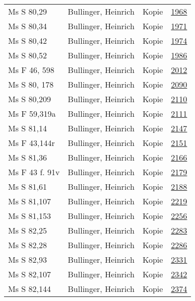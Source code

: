 \documentclass[10pt,a4paper,landscape]{report}
\begin{document}
\begin{longtable}{p{16cm}p{4cm}lr}
Ms S 80,29	&	Bullinger, Heinrich	&	Kopie	&	\href{http://130.60.24.72/assignment/1968}{1968}\\
Ms S 80,34	&	Bullinger, Heinrich	&	Kopie	&	\href{http://130.60.24.72/assignment/1971}{1971}\\
Ms S 80,42	&	Bullinger, Heinrich	&	Kopie	&	\href{http://130.60.24.72/assignment/1974}{1974}\\
Ms S 80,52	&	Bullinger, Heinrich	&	Kopie	&	\href{http://130.60.24.72/assignment/1986}{1986}\\
Ms F 46, 598	&	Bullinger, Heinrich	&	Kopie	&	\href{http://130.60.24.72/assignment/2012}{2012}\\
Ms S 80, 178	&	Bullinger, Heinrich	&	Kopie	&	\href{http://130.60.24.72/assignment/2090}{2090}\\
Ms S 80,209	&	Bullinger, Heinrich	&	Kopie	&	\href{http://130.60.24.72/assignment/2110}{2110}\\
Ms F 59,319a	&	Bullinger, Heinrich	&	Kopie	&	\href{http://130.60.24.72/assignment/2111}{2111}\\
Ms S 81,14	&	Bullinger, Heinrich	&	Kopie	&	\href{http://130.60.24.72/assignment/2147}{2147}\\
Ms F 43,144r	&	Bullinger, Heinrich	&	Kopie	&	\href{http://130.60.24.72/assignment/2151}{2151}\\
Ms S 81,36	&	Bullinger, Heinrich	&	Kopie	&	\href{http://130.60.24.72/assignment/2166}{2166}\\
Ms F 43 f. 91v	&	Bullinger, Heinrich	&	Kopie	&	\href{http://130.60.24.72/assignment/2179}{2179}\\
Ms S 81,61	&	Bullinger, Heinrich	&	Kopie	&	\href{http://130.60.24.72/assignment/2188}{2188}\\
Ms S 81,107	&	Bullinger, Heinrich	&	Kopie	&	\href{http://130.60.24.72/assignment/2219}{2219}\\
Ms S 81,153	&	Bullinger, Heinrich	&	Kopie	&	\href{http://130.60.24.72/assignment/2256}{2256}\\
Ms S 82,25	&	Bullinger, Heinrich	&	Kopie	&	\href{http://130.60.24.72/assignment/2283}{2283}\\
Ms S 82,28	&	Bullinger, Heinrich	&	Kopie	&	\href{http://130.60.24.72/assignment/2286}{2286}\\
Ms S 82,93	&	Bullinger, Heinrich	&	Kopie	&	\href{http://130.60.24.72/assignment/2331}{2331}\\
Ms S 82,107	&	Bullinger, Heinrich	&	Kopie	&	\href{http://130.60.24.72/assignment/2342}{2342}\\
Ms S 82,144	&	Bullinger, Heinrich	&	Kopie	&	\href{http://130.60.24.72/assignment/2374}{2374}\\

\end{longtable}
\end{document}
